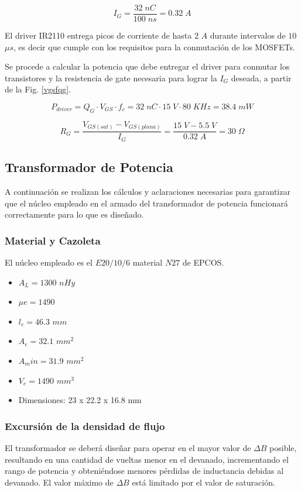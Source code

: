 \documentclass[11pt, a4paper]{article}
\begin{document}
\[ I_G = \frac{32 \; nC}{100 \; ns} = 0.32 \; A \]

El driver IR2110 entrega picos de corriente de hasta $2$ $A$ durante intervalos de $10$ $\mu s$, es decir que cumple con los requisitos para la conmutación de los MOSFETs.

Se procede a calcular la potencia que debe entregar el driver para conmutar los transistores y la resistencia de gate necesaria para lograr la $I_G$ deseada, a partir de la Fig. \ref{vgsfqg}.

\[ P_{driver} = Q_G \cdot V_{GS} \cdot f_c = 32 \; nC \cdot 15 \; V \cdot 80 \; KHz = 38.4 \; mW \]

\[ R_G = \frac{V_{GS(sat)} - V_{GS(plana)}}{I_G} = \frac{15 \; V - 5.5 \; V}{0.32 \; A} = 30 \; \Omega  \]

\subsection{Transformador de Potencia}
A continuación se realizan los cálculos y aclaraciones necesarias para garantizar que el núcleo empleado en el armado del transformador de potencia funcionará correctamente para lo que es diseñado.
\subsubsection{Material y Cazoleta}
El núcleo empleado es el $E20/10/6$ material $N27$ de EPCOS.
\begin{itemize}
	\item $A_L = 1300$ $nHy$
	\item $\mu e = 1490$
	\item $\mathit{l}_e = 46.3$ $mm$
	\item $A_e = 32.1$ $mm^2$
	\item $A_min = 31.9$ $mm^2$
	\item $V_e = 1490$ $mm^3$
	\item Dimensiones: 23 x 22.2 x 16.8 mm  
\end{itemize}
\subsubsection{Excursión de la densidad de flujo}
El transformador se deberá diseñar para operar en el mayor valor de $\Delta B$ posible, resultando en una cantidad de vueltas menor en el devanado, incrementando el rango de potencia y obteniéndose menores pérdidas de inductancia debidas al devanado. El valor máximo de $\Delta B$ está limitado por el valor de saturación.
\end{document}
